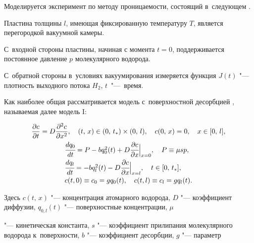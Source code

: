 \smallskip



 Моделируется эксперимент по методу проницаемости, состоящий в~следующем \cite{bormatova:bib:Kunin}.

Пластина толщины $l $, имеющая фиксированную температуру $T$, является перегородкой вакуумной камеры.

С~входной стороны пластины, начиная с момента $t=0$, поддерживается постоянное давление $p$ молекулярного водорода.

С~обратной стороны в~условиях вакуумирования измеряется функция $J(t)$ "--- плотность выходного потока $H_2$, \mbox{$t$ "--- время.}



Как наиболее общая рассматривается модель с~поверхностной десорбцией \cite{bormatova:bib:Gabis}, называемая далее модель I:

\begin{gather} \label{bormot:diff}

\frac{\partial c}{\partial t} = D\frac{\partial^2 c} {\partial x^2}, \quad (t,\,x) \in (0,\,t_*)\times(0,\,l ), \quad  c(0,\,x)=0,\quad x\in [0,\,l ],\\

\label{bormot:suff}

   \begin{array}{l}

   \cfrac{dq_0}{dt}=P-bq_0^2(t)+D\cfrac{\partial c}{\partial x}\Big|_{x=0}, \quad P\equiv \mu sp, \vspace{1mm} \\

   \cfrac{dq_l }{dt}=-bq_{l }^2(t)-D\cfrac{\partial c}{\partial x}\Big|_{x=l }, \quad t\in [0,\,t_*], \vspace{1mm} \\

   c(t,0)\equiv c_0=gq_0(t), \quad c(t,l )\equiv c_{l }=gq_{l }(t).

   \end{array}

\end{gather}

Здесь $c(t,\,x)$ "--- концентрация атомарного водорода, $D$ "--- коэффициент диффузии, $q_{0,l }(t)$ "--- поверхностные концентрации, $\mu$

"--- кинетическая константа, $s$ "--- коэффициент прилипания молекулярного водорода к~поверхности, $b$ "--- коэффициент десорбции, $g$ "--- параметр

